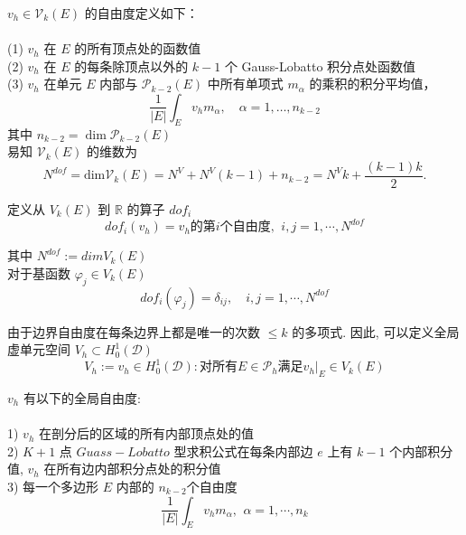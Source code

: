 \documentclass[12pt]{article}
\begin{document}
\begin{CJK}{UTF8}{gkai}
    $v_h\in \mathcal V_k(E)$ 的自由度定义如下：\\
    \\
    (1) $v_h$ 在 $E$ 的所有顶点处的函数值\\
    (2) $v_h$ 在 $E$ 的每条除顶点以外的 $k-1$ 个 Gauss-Lobatto 积分点处函数值 \\ 
    (3) $v_h$ 在单元 $E$ 内部与 $\mathcal P_{k-2}(E)$ 中所有单项式 $m_\alpha$ 的乘积的积分平均值， $$ \frac{1}{|E|}\int_E v_h m_\alpha, \quad \alpha = 1, \ldots, n_{k-2}$$
    其中 $n_{k-2} = \dim \mathcal P_{k-2}(E)$\\
    
    易知 $\mathcal V_k(E)$ 的维数为 \\
    \begin{equation}
    N^{dof} = \text{dim} \mathcal V_k(E) = N^V + N^V(k - 1) + n_{k - 2} = N^Vk+ \frac{(k-1)k}{2}.
    \end{equation}
    
    定义从 $V_k(E)$ 到 $\mathbb{R}$ 的算子 $dof_i$ \\
    \begin{equation}
    dof_{i}(v_h) = v_h \text{的第} i \text{个自由度}, \,\ i,j = 1,\cdots, N^{dof} 
    \end{equation}
    
    其中 $N^{dof} := dimV_k(E)$ \\
    
    对于基函数 $\varphi_j \in V_k(E)$ \\
    \begin{equation}
    dof_{i}(\varphi_j) = \delta_{ij},\quad i,j = 1,\cdots,N^{dof} 
    \end{equation}
    
    由于边界自由度在每条边界上都是唯一的次数 $\le k$ 的多项式. 因此, 可以定义全局虚单元空间 $V_h \subset H_0^1(\mathcal D)$ \\
    \begin{equation*}
    V_h := {v_h \in H_0^1(\mathcal D) : \text{对所有} E\in\mathcal{P}_h \text{满足} v_h|_E \in V_k(E)}
    \end{equation*}
    
    $v_h$ 有以下的全局自由度: \\
    \\
    1) $v_h$ 在剖分后的区域的所有内部顶点处的值 \\
    2) $K + 1$ 点 $Guass-Lobatto$ 型求积公式在每条内部边 $e$ 上有 $k - 1$ 个内部积分值, $v_h$ 在所有边内部积分点处的积分值 \\  
    3) 每一个多边形 $E$ 内部的 $n_{k - 2}$个自由度\\
    \begin{equation}
    \frac{1}{|E|}\int_{E}v_hm_{\alpha},\,\ \alpha = 1,\cdots,n_k
    \end{equation}
    

\end{CJK}
\end{document}
